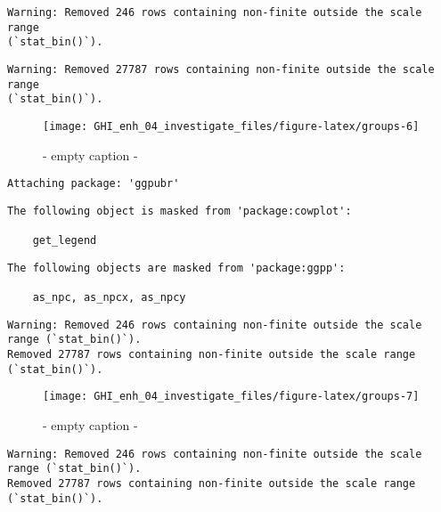 \documentclass[
  10pt,
  a4paper,oneside]{article}
\begin{document}
\begin{verbatim}
Warning: Removed 246 rows containing non-finite outside the scale range
(`stat_bin()`).
\end{verbatim}

\begin{verbatim}
Warning: Removed 27787 rows containing non-finite outside the scale range
(`stat_bin()`).
\end{verbatim}

\begin{figure}[H]

{\centering \texttt{[image: GHI\_enh\_04\_investigate\_files/figure-latex/groups-6]} 

}

\caption{ - empty caption - }\label{fig:groups-6}
\end{figure}

\begin{verbatim}
Attaching package: 'ggpubr'
\end{verbatim}

\begin{verbatim}
The following object is masked from 'package:cowplot':

    get_legend
\end{verbatim}

\begin{verbatim}
The following objects are masked from 'package:ggpp':

    as_npc, as_npcx, as_npcy
\end{verbatim}

\begin{verbatim}
Warning: Removed 246 rows containing non-finite outside the scale range (`stat_bin()`).
Removed 27787 rows containing non-finite outside the scale range (`stat_bin()`).
\end{verbatim}

\begin{figure}[H]

{\centering \texttt{[image: GHI\_enh\_04\_investigate\_files/figure-latex/groups-7]} 

}

\caption{ - empty caption - }\label{fig:groups-7}
\end{figure}

\begin{verbatim}
Warning: Removed 246 rows containing non-finite outside the scale range (`stat_bin()`).
Removed 27787 rows containing non-finite outside the scale range (`stat_bin()`).
\end{verbatim}
\end{document}
